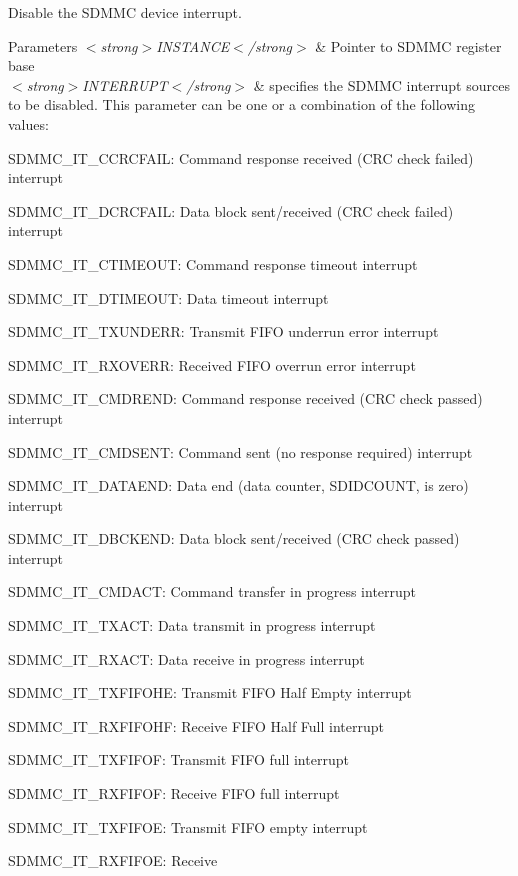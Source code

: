 Disable the S\+D\+M\+MC device interrupt. 


\begin{DoxyParams}{Parameters}
{\em $<$strong$>$\+I\+N\+S\+T\+A\+N\+C\+E$<$/strong$>$} & Pointer to S\+D\+M\+MC register base\\
\hline
{\em $<$strong$>$\+I\+N\+T\+E\+R\+R\+U\+P\+T$<$/strong$>$} & specifies the S\+D\+M\+MC interrupt sources to be disabled. This parameter can be one or a combination of the following values\+: \begin{DoxyItemize}
\item S\+D\+M\+M\+C\+\_\+\+I\+T\+\_\+\+C\+C\+R\+C\+F\+A\+IL\+: Command response received (C\+RC check failed) interrupt \item S\+D\+M\+M\+C\+\_\+\+I\+T\+\_\+\+D\+C\+R\+C\+F\+A\+IL\+: Data block sent/received (C\+RC check failed) interrupt \item S\+D\+M\+M\+C\+\_\+\+I\+T\+\_\+\+C\+T\+I\+M\+E\+O\+UT\+: Command response timeout interrupt \item S\+D\+M\+M\+C\+\_\+\+I\+T\+\_\+\+D\+T\+I\+M\+E\+O\+UT\+: Data timeout interrupt \item S\+D\+M\+M\+C\+\_\+\+I\+T\+\_\+\+T\+X\+U\+N\+D\+E\+RR\+: Transmit F\+I\+FO underrun error interrupt \item S\+D\+M\+M\+C\+\_\+\+I\+T\+\_\+\+R\+X\+O\+V\+E\+RR\+: Received F\+I\+FO overrun error interrupt \item S\+D\+M\+M\+C\+\_\+\+I\+T\+\_\+\+C\+M\+D\+R\+E\+ND\+: Command response received (C\+RC check passed) interrupt \item S\+D\+M\+M\+C\+\_\+\+I\+T\+\_\+\+C\+M\+D\+S\+E\+NT\+: Command sent (no response required) interrupt \item S\+D\+M\+M\+C\+\_\+\+I\+T\+\_\+\+D\+A\+T\+A\+E\+ND\+: Data end (data counter, S\+D\+I\+D\+C\+O\+U\+NT, is zero) interrupt \item S\+D\+M\+M\+C\+\_\+\+I\+T\+\_\+\+D\+B\+C\+K\+E\+ND\+: Data block sent/received (C\+RC check passed) interrupt \item S\+D\+M\+M\+C\+\_\+\+I\+T\+\_\+\+C\+M\+D\+A\+CT\+: Command transfer in progress interrupt \item S\+D\+M\+M\+C\+\_\+\+I\+T\+\_\+\+T\+X\+A\+CT\+: Data transmit in progress interrupt \item S\+D\+M\+M\+C\+\_\+\+I\+T\+\_\+\+R\+X\+A\+CT\+: Data receive in progress interrupt \item S\+D\+M\+M\+C\+\_\+\+I\+T\+\_\+\+T\+X\+F\+I\+F\+O\+HE\+: Transmit F\+I\+FO Half Empty interrupt \item S\+D\+M\+M\+C\+\_\+\+I\+T\+\_\+\+R\+X\+F\+I\+F\+O\+HF\+: Receive F\+I\+FO Half Full interrupt \item S\+D\+M\+M\+C\+\_\+\+I\+T\+\_\+\+T\+X\+F\+I\+F\+OF\+: Transmit F\+I\+FO full interrupt \item S\+D\+M\+M\+C\+\_\+\+I\+T\+\_\+\+R\+X\+F\+I\+F\+OF\+: Receive F\+I\+FO full interrupt \item S\+D\+M\+M\+C\+\_\+\+I\+T\+\_\+\+T\+X\+F\+I\+F\+OE\+: Transmit F\+I\+FO empty interrupt \item S\+D\+M\+M\+C\+\_\+\+I\+T\+\_\+\+R\+X\+F\+I\+F\+OE\+: Receive 
\end{DoxyItemize}
\end{DoxyParams}
